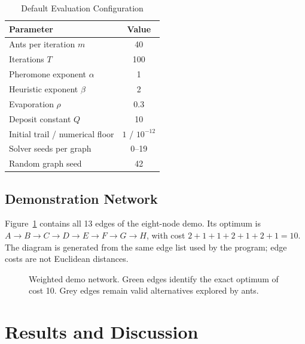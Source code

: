 \documentclass[conference]{IEEEtran}
\begin{document}
\begin{table}[tb]
\caption{Default Evaluation Configuration}
\label{tab:parameters}
\centering
\begin{tabular}{lc}\hline
Parameter & Value\\\hline
Ants per iteration $m$ & 40\\
Iterations $T$ & 100\\
Pheromone exponent $\alpha$ & 1\\
Heuristic exponent $\beta$ & 2\\
Evaporation $\rho$ & 0.3\\
Deposit constant $Q$ & 10\\
Initial trail / numerical floor & $1$ / $10^{-12}$\\
Solver seeds per graph & 0--19\\
Random graph seed & 42\\\hline
\end{tabular}
\end{table}

\subsection{Demonstration Network}
Figure~\ref{fig:graph} contains all 13 edges of the eight-node demo. Its optimum is $A\!\to\!B\!\to\!C\!\to\!D\!\to\!E\!\to\!F\!\to\!G\!\to\!H$, with cost $2+1+1+2+1+2+1=10$. The diagram is generated from the same edge list used by the program; edge costs are not Euclidean distances.

\begin{figure}[tb]
\centering
{}
\caption{Weighted demo network. Green edges identify the exact optimum of cost 10. Grey edges remain valid alternatives explored by ants.}
\label{fig:graph}
\end{figure}

\section{Results and Discussion}
\end{document}
